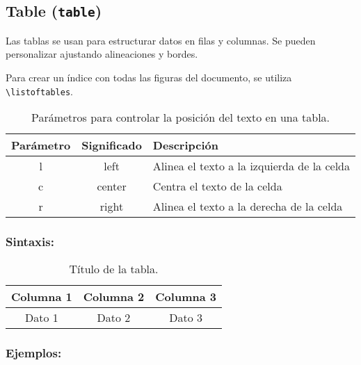 
\subsection{Table (\texttt{table})}\label{table}
Las tablas se usan para estructurar datos en filas y columnas. Se pueden personalizar ajustando alineaciones y bordes.

Para crear un índice con todas las figuras del documento, se utiliza \verb|\listoftables|.\\

\begin{table}[h]
    \centering
    \begin{tabular}{c|c|l}
        \hline
        Parámetro & Significado & Descripción\\
        \hline
        l & left & Alinea el texto a la izquierda de la celda \\
        \hline
        c & center & Centra el texto de la celda\\
        \hline
        r & right & Alinea el texto a la derecha de la celda\\
        \hline
    \end{tabular}
    \caption{Parámetros para controlar la posición del texto en una tabla.}
    \label{tabla:parametros_tabla}
\end{table}

\subsubsection*{Sintaxis:}
\begin{codigo}
\begin{LTXexample}[numbers=none]
    \begin{table}[placement]
        \centering
        \begin{tabular}{|c|c|c|}
        \hline
        Columna 1 & Columna 2 & Columna 3 \\ \hline
        Dato 1 & Dato 2 & Dato 3 \\ \hline
    \end{tabular}
    \caption{Título de la tabla.}
    \label{unatabla}
    \end{table}
\end{LTXexample}
\label{sintaxis:table}
\end{codigo}

\subsubsection*{Ejemplos:}

